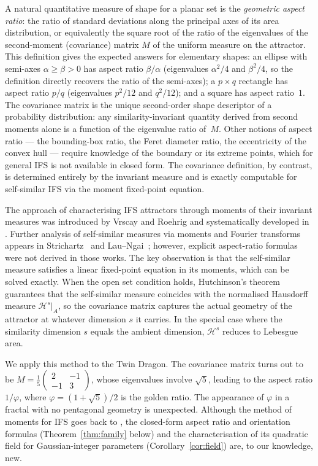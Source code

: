 \documentclass{amsart}
\theoremstyle{definition}
\theoremstyle{remark}
\begin{document}
A natural quantitative measure of shape for a planar set is the \emph{geometric aspect
ratio}: the ratio of standard deviations along the principal axes of its area
distribution, or equivalently the square root of the ratio of the eigenvalues of the
second-moment (covariance) matrix $M$ of the uniform measure on the attractor.
This definition gives the expected answers for elementary shapes:
an ellipse with semi-axes $\alpha \geq \beta > 0$ has aspect ratio $\beta/\alpha$
(eigenvalues $\alpha^2/4$ and $\beta^2/4$, so the definition directly recovers the
ratio of the semi-axes); a $p \times q$ rectangle has aspect ratio $p/q$
(eigenvalues $p^2/12$ and $q^2/12$); and a square has aspect ratio~$1$.
The covariance matrix is the unique second-order shape descriptor of a
probability distribution: any similarity-invariant quantity derived
from second moments alone is a function of the eigenvalue ratio of~$M$.
Other notions of aspect ratio --- the bounding-box ratio, the Feret
diameter ratio, the eccentricity of the convex hull --- require
knowledge of the boundary or its extreme points,
which for general IFS is not available in closed form.
The covariance definition, by contrast, is determined entirely by the
invariant measure and is exactly computable for self-similar IFS via
the moment fixed-point equation.

The approach of characterising IFS attractors through moments of their invariant
measures was introduced by Vrscay and Roehrig \cite{VrscayRoehrig1989} and
systematically developed in \cite{Vrscay1991}.
Further analysis of self-similar measures via moments and Fourier transforms
appears in Strichartz~\cite{Strichartz1993} and Lau--Ngai~\cite{LauNgai1999};
however, explicit aspect-ratio formulas were not derived in those works.
The key observation is that the
self-similar measure satisfies a linear fixed-point equation in its moments, which
can be solved exactly.  When the open set condition holds, Hutchinson's theorem
\cite{Hutchinson1981} guarantees that the self-similar measure coincides with the
normalised Hausdorff measure $\mathcal{H}^s|_A$, so the covariance matrix captures
the actual geometry of the attractor at whatever dimension $s$ it carries.  In the
special case where the similarity dimension $s$ equals the ambient dimension,
$\mathcal{H}^s$ reduces to Lebesgue area.

We apply this method to the Twin Dragon.  The covariance matrix turns out to be
$M = \tfrac{1}{5}\begin{pmatrix}2&-1\\-1&3\end{pmatrix}$,
whose eigenvalues involve $\sqrt{5}$, leading to the aspect ratio $1/\varphi$,
where $\varphi = (1+\sqrt{5})/2$ is the golden ratio.  The appearance of $\varphi$
in a fractal with no pentagonal geometry is unexpected.
Although the method of moments for IFS goes back to \cite{VrscayRoehrig1989},
the closed-form aspect ratio and orientation formulas
(Theorem~\ref{thm:family} below) and the
characterisation of its quadratic field for Gaussian-integer parameters
(Corollary~\ref{cor:field}) are, to our knowledge, new.
\end{document}
